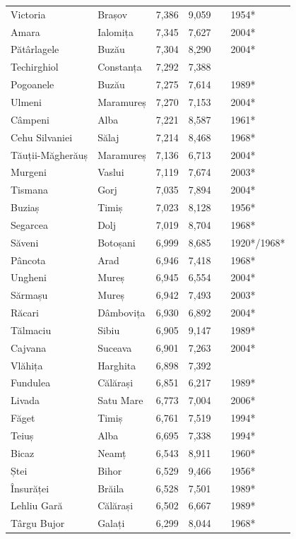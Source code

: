 \documentclass{article}
\begin{document}
\begin{tabular}{llllll}
Victoria & Brașov & 7,386 & 9,059 &  & 1954* \\
Amara & Ialomița & 7,345 & 7,627 &  & 2004* \\
Pătârlagele & Buzău & 7,304 & 8,290 &  & 2004* \\
Techirghiol & Constanța & 7,292 & 7,388 &  &  \\
Pogoanele & Buzău & 7,275 & 7,614 &  & 1989* \\
Ulmeni & Maramureș & 7,270 & 7,153 &  & 2004* \\
Câmpeni & Alba & 7,221 & 8,587 &  & 1961* \\
Cehu Silvaniei & Sălaj & 7,214 & 8,468 &  & 1968* \\
Tăuții-Măgherăuș & Maramureș & 7,136 & 6,713 &  & 2004* \\
Murgeni & Vaslui & 7,119 & 7,674 &  & 2003* \\
Tismana & Gorj & 7,035 & 7,894 &  & 2004* \\
Buziaș & Timiș & 7,023 & 8,128 &  & 1956* \\
Segarcea & Dolj & 7,019 & 8,704 &  & 1968* \\
Săveni & Botoșani & 6,999 & 8,685 &  & 1920*/1968* \\
Pâncota & Arad & 6,946 & 7,418 &  & 1968* \\
Ungheni & Mureș & 6,945 & 6,554 &  & 2004* \\
Sărmașu & Mureș & 6,942 & 7,493 &  & 2003* \\
Răcari & Dâmbovița & 6,930 & 6,892 &  & 2004* \\
Tălmaciu & Sibiu & 6,905 & 9,147 &  & 1989* \\
Cajvana & Suceava & 6,901 & 7,263 &  & 2004* \\
Vlăhița & Harghita & 6,898 & 7,392 &  &  \\
Fundulea & Călărași & 6,851 & 6,217 &  & 1989* \\
Livada & Satu Mare & 6,773 & 7,004 &  & 2006* \\
Făget & Timiș & 6,761 & 7,519 &  & 1994* \\
Teiuș & Alba & 6,695 & 7,338 &  & 1994* \\
Bicaz & Neamț & 6,543 & 8,911 &  & 1960* \\
Ștei & Bihor & 6,529 & 9,466 &  & 1956* \\
Însurăței & Brăila & 6,528 & 7,501 &  & 1989* \\
Lehliu Gară & Călărași & 6,502 & 6,667 &  & 1989* \\
Târgu Bujor & Galați & 6,299 & 8,044 &  & 1968* \\

\end{tabular}
\end{document}

